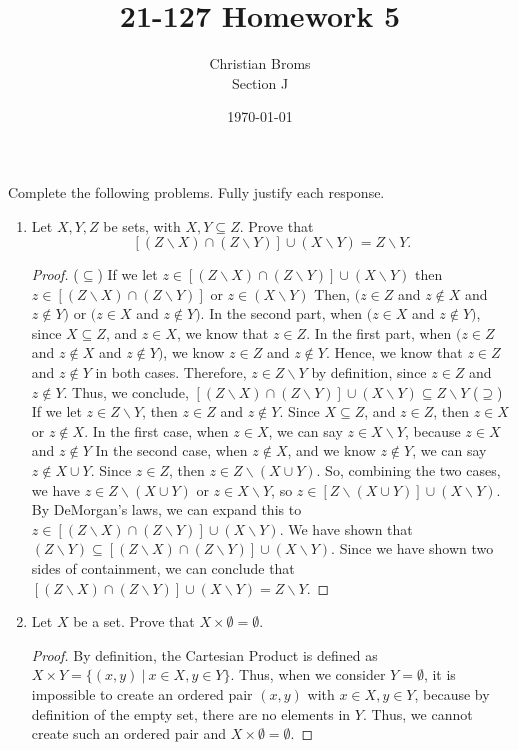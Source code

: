 \documentclass[12pt]{article}
\newcommand{\ba}{\backslash}
\begin{document}
\title{21-127 Homework 5}
\author{Christian Broms \\ Section J}
\date{\today}
\maketitle

Complete the following problems. Fully justify each response.

\begin{enumerate}

\item Let $X, Y, Z$ be sets, with $X,Y\subseteq Z$. Prove that \[\left[ (Z\ba X)\cap (Z\ba Y)\right] \cup (X\ba Y) = Z\ba Y.\]

\begin{proof}

($\subseteq$) If we let $z \in \left[ (Z\ba X)\cap (Z\ba Y)\right] \cup (X \ba Y)$ then $z \in \left[ (Z\ba X)\cap (Z\ba Y)\right] $ or $ z \in (X \ba Y)$ Then, $(z \in Z $ and $ z \notin X$ and $ z\notin Y) $ or $ (z \in X $ and $ z \notin Y)$. In the second part, when $(z \in X $ and $ z \notin Y)$, since $X \subseteq Z$, and $z \in X$, we know that $z \in Z$. In the first part, when $(z \in Z $ and $ z \notin X$ and $ z\notin Y) $, we know $z \in Z$ and $z \notin Y$.
Hence, we know that $z \in Z$ and $z \notin Y$ in both cases. Therefore, $z \in Z \ba Y$ by definition, since $z \in Z$ and $z \notin Y$. Thus, we conclude, $\left[ (Z\ba X)\cap (Z\ba Y)\right] \cup (X\ba Y) \subseteq Z\ba Y$ \hfill \break \break
($\supseteq$) If we let $z \in Z \ba Y$, then $z \in Z$ and $z \notin Y$. Since $X \subseteq Z$, and $z \in Z$, then $z \in X$ or $z \notin X$. In the first case, when $z \in X$, we can say $z \in X \ba Y$, because $z \in X$ and $z \notin Y$ In the second case, when $z \notin X$, and we know $z \notin Y$, we can say $z \notin X \cup Y$. Since $z\in Z$, then $z \in Z \ba (X \cup Y)$. So, combining the two cases, we have $z \in Z \ba (X \cup Y)$ or $z \in X \ba Y$, so $z \in [Z \ba (X \cup Y)] \cup (X \ba Y)$. By DeMorgan's laws, we can expand this to $z \in \left[ (Z\ba X)\cap (Z\ba Y)\right] \cup (X\ba Y)$. We have shown that $ (Z \ba Y)\subseteq  \left[ (Z\ba X)\cap (Z\ba Y)\right] \cup (X\ba Y)$. \hfill \break \break
Since we have shown two sides of containment, we can conclude that $\left[ (Z\ba X)\cap (Z\ba Y)\right] \cup (X\ba Y) = Z\ba Y.$
\end{proof}

\item Let $X$ be a set. Prove that $X\times \emptyset = \emptyset$.
\begin{proof}
By definition, the Cartesian Product is defined as $X\times Y = \{(x,y)\ |\ x \in X, y \in Y\}$. Thus, when we consider $Y = \emptyset$, it is impossible to create an ordered pair $(x, y)$ with $x \in X, y \in Y$, because by definition of the empty set, there are no elements in $Y$. Thus, we cannot create such an ordered pair and $X \times \emptyset = \emptyset$.
\end{proof}


\end{enumerate}
\end{document}
